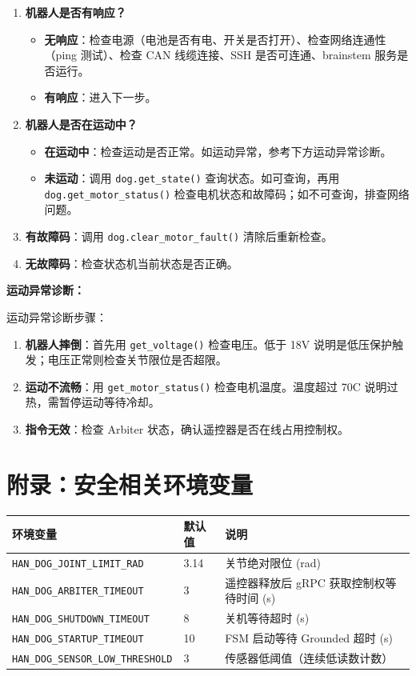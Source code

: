 \documentclass[a4paper,11pt,openany]{book}
\begin{document}
\begin{enumerate}[nosep]
  \item \textbf{机器人是否有响应？}
  \begin{itemize}[nosep]
    \item \textbf{无响应}：检查电源（电池是否有电、开关是否打开）、检查网络连通性（ping 测试）、检查 CAN 线缆连接、SSH 是否可连通、brainstem 服务是否运行。
    \item \textbf{有响应}：进入下一步。
  \end{itemize}
  \item \textbf{机器人是否在运动中？}
  \begin{itemize}[nosep]
    \item \textbf{在运动中}：检查运动是否正常。如运动异常，参考下方运动异常诊断。
    \item \textbf{未运动}：调用 \texttt{dog.get\_state()} 查询状态。如可查询，再用 \texttt{dog.get\_motor\_status()} 检查电机状态和故障码；如不可查询，排查网络问题。
  \end{itemize}
  \item \textbf{有故障码}：调用 \texttt{dog.clear\_motor\_fault()} 清除后重新检查。
  \item \textbf{无故障码}：检查状态机当前状态是否正确。
\end{enumerate}

\noindent\textbf{运动异常诊断：}

运动异常诊断步骤：

\begin{enumerate}[nosep]
  \item \textbf{机器人摔倒}：首先用 \texttt{get\_voltage()} 检查电压。低于 18V 说明是低压保护触发；电压正常则检查关节限位是否超限。
  \item \textbf{运动不流畅}：用 \texttt{get\_motor\_status()} 检查电机温度。温度超过 70\textdegree C 说明过热，需暂停运动等待冷却。
  \item \textbf{指令无效}：检查 Arbiter 状态，确认遥控器是否在线占用控制权。
\end{enumerate}

\section*{附录：安全相关环境变量}

\begin{longtable}{lll}
\toprule
环境变量 & 默认值 & 说明 \\
\midrule
\endhead
\texttt{HAN\_DOG\_JOINT\_LIMIT\_RAD} & 3.14 & 关节绝对限位 (rad) \\
\texttt{HAN\_DOG\_ARBITER\_TIMEOUT} & 3 & 遥控器释放后 gRPC 获取控制权等待时间 (s) \\
\texttt{HAN\_DOG\_SHUTDOWN\_TIMEOUT} & 8 & 关机等待超时 (s) \\
\texttt{HAN\_DOG\_STARTUP\_TIMEOUT} & 10 & FSM 启动等待 Grounded 超时 (s) \\
\texttt{HAN\_DOG\_SENSOR\_LOW\_THRESHOLD} & 3 & 传感器低阈值（连续低读数计数） \\
\bottomrule
\end{longtable}
\end{document}
